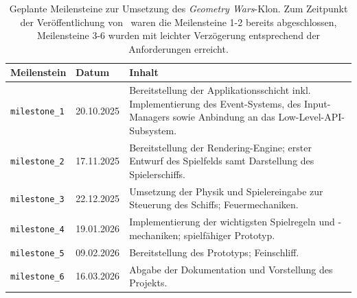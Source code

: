 \setlength{\tabcolsep}{8pt}
\begin{table}[t]
    \centering
    {\renewcommand{\arraystretch}{1.2}%
        \begin{tabularx}{\textwidth}{@{} l l Y @{}}
        \toprule
        \textbf{Meilenstein} & \textbf{Datum} & \textbf{Inhalt} \\
        \midrule
        \texttt{milestone\_1} & 20.10.2025 &
        Bereitstellung der Applikationsschicht inkl. Implementierung des Event-Systems,
        des Input-Managers sowie Anbindung an das Low-Level-API-Subsystem. \\
        \texttt{milestone\_2} & 17.11.2025 &
        Bereitstellung der Rendering-Engine; erster Entwurf des Spielfelds samt Darstellung des Spielerschiffs. \\
        \texttt{milestone\_3} & 22.12.2025 &
        Umsetzung der Physik und Spielereingabe zur Steuerung des Schiffs; Feuermechaniken. \\
        \texttt{milestone\_4} & 19.01.2026 &
        Implementierung der wichtigsten Spielregeln und -mechaniken; spielfähiger Prototyp. \\
        \texttt{milestone\_5} & 09.02.2026 &
        Bereitstellung des Prototyps; Feinschliff. \\
        \texttt{milestone\_6} & 16.03.2026 &
        Abgabe der Dokumentation und Vorstellung des Projekts. \\
        \bottomrule
        \end{tabularx}}
    \caption{Geplante Meilensteine zur Umsetzung des \textit{Geometry Wars}-Klon.
    Zum Zeitpunkt der Veröffentlichung von~\cite{SH25} waren die Meilensteine 1-2 bereits abgeschlossen, Meilensteine 3-6 wurden mit leichter Verzögerung entsprechend der Anforderungen erreicht.}
    \label{tab:zeitplan}
\end{table}




